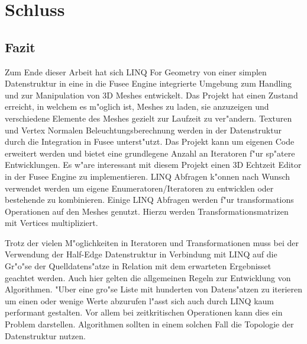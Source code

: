 \documentclass[pagesize, paper=a4, fontsize=12pt,titlepage=true, headings=small, headnosepline, abstractoff, liststotoc, nochapterprefix, plainheadsepline]{scrreprt}
\newcommand{\LFG}{LINQ For Geometry}
\newcommand{\LFGS}{LINQ For Geometry }
\newcommand{\HES}{Half-Edge Datenstruktur }
\begin{document}





\chapter {Schluss}
	\section {Fazit}
		Zum Ende dieser Arbeit hat sich \LFGS von einer simplen Datenstruktur in eine in die Fusee Engine integrierte Umgebung zum Handling und zur Manipulation von 3D Meshes entwickelt. Das Projekt hat einen Zustand erreicht, in welchem es m"oglich ist, Meshes zu laden, sie anzuzeigen und verschiedene Elemente des Meshes gezielt zur Laufzeit zu ver"andern. Texturen und Vertex Normalen Beleuchtungsberechnung werden in der Datenstruktur durch die Integration in Fusee unterst"utzt. Das Projekt kann um eigenen Code erweitert werden und bietet eine grundlegene Anzahl an Iteratoren f"ur sp"atere Entwicklungen. Es w"are interessant mit diesem Projekt einen 3D Echtzeit Editor in der Fusee Engine zu implementieren. LINQ Abfragen k"onnen nach Wunsch verwendet werden um eigene Enumeratoren/Iteratoren zu entwicklen oder bestehende zu kombinieren. Einige LINQ Abfragen werden f"ur transformations Operationen auf den Meshes genutzt. Hierzu werden Transformationsmatrizen mit Vertices multipliziert.

Trotz der vielen M"oglichkeiten in Iteratoren und Transformationen muss bei der Verwendung der \HES in Verbindung mit LINQ auf die Gr"o"se der Quelldatens"atze in Relation mit dem erwarteten Ergebnisset geachtet werden. Auch hier gelten die allgemeinen Regeln zur Entwicklung von Algorithmen. "Uber eine gro"se Liste mit hunderten von Datens"atzen zu iterieren um einen oder wenige Werte abzurufen l"asst sich auch durch LINQ kaum performant gestalten. Vor allem bei zeitkritischen Operationen kann dies ein Problem darstellen. Algorithmen sollten in einem solchen Fall die Topologie der Datenstruktur nutzen.
\end{document}
